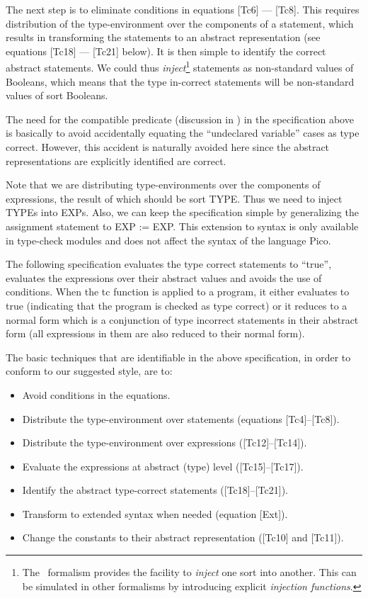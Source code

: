 The next step is to eliminate conditions in equations [Tc6] --- [Tc8]. 
This requires distribution of the type-environment over
the components of a statement, which results in transforming
the statements to an abstract representation (see equations
[Tc18] --- [Tc21] below).
It is then simple to identify the correct abstract statements.
We could thus {\em inject}\footnote{The \asdf\ formalism
  provides the facility to {\em inject} one sort into another.
  This can be simulated in other formalisms by introducing
  explicit {\em injection functions}.
} statements as non-standard values
of Booleans, which means that the type in-correct statements will be 
non-standard values of sort Booleans.

The need for the compatible predicate (discussion in \cite{BHK89})
in the specification above is basically to avoid accidentally equating
the ``undeclared variable'' cases as type correct.
However, this accident is naturally avoided here since the
abstract representations are explicitly identified are correct.

Note that we are distributing type-environments
over the components of expressions, the result of which
should be sort TYPE.  Thus we need to inject TYPEs into EXPs. 
Also, we can keep the specification simple by generalizing
the assignment statement to EXP := EXP.
This extension to syntax is only available in type-check modules 
and does not affect the syntax of the language Pico.

The following specification evaluates the type correct
statements to ``true'', evaluates the expressions
over their abstract values and avoids the use of 
conditions.
When the tc function is applied to a program,
it either evaluates to true (indicating that the program
is checked as type correct) or it reduces to a normal
form which is a conjunction of type incorrect statements
in their abstract form (all expressions in them are
also reduced to their normal form).



The basic techniques that are identifiable in the above specification,
in order to conform to our suggested style, are to:
\begin{itemize}
\item Avoid conditions in the equations.
\item Distribute the type-environment over statements (equations [Tc4]--[Tc8]).
\item Distribute the type-environment over expressions ([Tc12]--[Tc14]).
\item Evaluate the expressions at abstract (type) level ([Tc15]--[Tc17]).
\item Identify the abstract type-correct statements ([Tc18]--[Tc21]).
\item Transform to extended syntax when needed (equation [Ext]).
\item Change the constants to their abstract representation ([Tc10] and [Tc11]).
\end{itemize}

